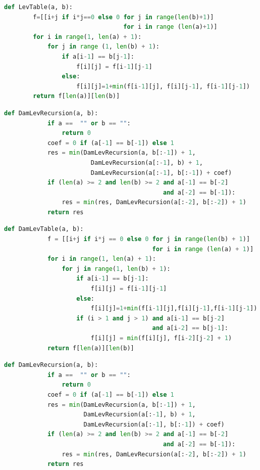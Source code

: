 \documentclass[a4paper, 12pt]{article}
\begin{document}
\begin{flushleft}

	\lstset{style=mystyle}

	\begin{lstlisting}[language=Python, caption = Расстояние Левенштейна]
	def LevTable(a, b):
		f=[[i+j if i*j==0 else 0 for j in range(len(b)+1)] 
		                         for i in range (len(a)+1)]
		for i in range(1, len(a) + 1):
			for j in range (1, len(b) + 1):
				if a[i-1] == b[j-1]:
					f[i][j] = f[i-1][j-1]
				else:
					f[i][j]=1+min(f[i-1][j], f[i][j-1], f[i-1][j-1])
		return f[len(a)][len(b)]
	\end{lstlisting}

	\begin{lstlisting}[language=Python, caption = Рекурсивное расстояние Левенштейна]
		def DamLevRecursion(a, b):
			if a ==  "" or b == "":
				return 0
			coef = 0 if (a[-1] == b[-1]) else 1
			res = min(DamLevRecursion(a, b[:-1]) + 1, 
						DamLevRecursion(a[:-1], b) + 1, 
		    			DamLevRecursion(a[:-1], b[:-1]) + coef)
			if (len(a) >= 2 and len(b) >= 2 and a[-1] == b[-2] 
											and a[-2] == b[-1]):
				res = min(res, DamLevRecursion(a[:-2], b[:-2]) + 1)
			return res 
	\end{lstlisting}

	\begin{lstlisting}[language=Python, caption = Расстояние Дамерау-Левенштейна]
		def DamLevTable(a, b):
			f = [[i+j if i*j == 0 else 0 for j in range(len(b) + 1)] 
										 for i in range (len(a) + 1)]
			for i in range(1, len(a) + 1):
				for j in range(1, len(b) + 1):
					if a[i-1] == b[j-1]:
						f[i][j] = f[i-1][j-1]
					else:
						f[i][j]=1+min(f[i-1][j],f[i][j-1],f[i-1][j-1])
					if (i > 1 and j > 1) and a[i-1] == b[j-2] 
										 and a[i-2] == b[j-1]:
						f[i][j] = min(f[i][j], f[i-2][j-2] + 1)
			return f[len(a)][len(b)]
	\end{lstlisting}
	\begin{lstlisting}[language=Python, caption = Рекурсивное расстояние Дамерау-Левенштейна]
		def DamLevRecursion(a, b):
			if a ==  "" or b == "":
				return 0
			coef = 0 if (a[-1] == b[-1]) else 1
			res = min(DamLevRecursion(a, b[:-1]) + 1,
					  DamLevRecursion(a[:-1], b) + 1,
		              DamLevRecursion(a[:-1], b[:-1]) + coef)
			if (len(a) >= 2 and len(b) >= 2 and a[-1] == b[-2] 
											and a[-2] == b[-1]):
				res = min(res, DamLevRecursion(a[:-2], b[:-2]) + 1)
			return res 
	\end{lstlisting}

\end{flushleft}
\end{document}
